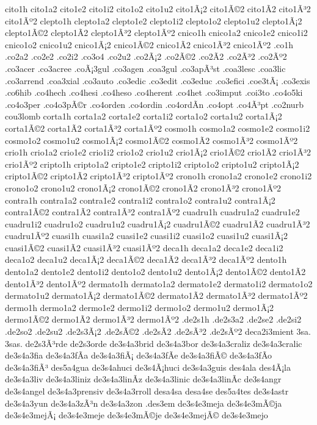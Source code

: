 {cito1h
cito1a2 cito1e2 cito1i2 cito1o2 cito1u2
cito1Ã¡2 cito1Ã©2 cito1Ã­2 cito1Ã³2 cito1Ãº2
clepto1h
clepto1a2 clepto1e2 clepto1i2 clepto1o2 clepto1u2
clepto1Ã¡2 clepto1Ã©2 clepto1Ã­2 clepto1Ã³2 clepto1Ãº2
cnico1h
cnico1a2 cnico1e2 cnico1i2 cnico1o2 cnico1u2
cnico1Ã¡2 cnico1Ã©2 cnico1Ã­2 cnico1Ã³2 cnico1Ãº2
.co1h
.co2a2
.co2e2
.co2i2
.co3o4
.co2u2
.co2Ã¡2
.co2Ã©2
.co2Ã­2
.co2Ã³2
.co2Ãº2
.co3acer
.co3acree
.coÃ¡3gul
.co3agen
.coa3gul
.co3apÃ³st
.coa3lesc
.coa3lic
.co3arrend
.coa3xial
.co3auto
.co3edic
.co3edit
.co3educ
.co3efici
.coe3tÃ¡
.co3exis
.co6hib
.co4hech
.co4hesi
.co4heso
.co4herent
.co4het
.co3imput
.coi3to
.co4o5ki
.co4o3per
.co4o3pÃ©r
.co4orden
.co4ordin
.co4ordÃ­n
.co4opt
.co4Ã³pt
.co2nurb
cou3lomb
corta1h
corta1a2 corta1e2 corta1i2 corta1o2 corta1u2
corta1Ã¡2 corta1Ã©2 corta1Ã­2 corta1Ã³2 corta1Ãº2
cosmo1h
cosmo1a2 cosmo1e2 cosmo1i2 cosmo1o2 cosmo1u2
cosmo1Ã¡2 cosmo1Ã©2 cosmo1Ã­2 cosmo1Ã³2 cosmo1Ãº2
crio1h
crio1a2 crio1e2 crio1i2 crio1o2 crio1u2
crio1Ã¡2 crio1Ã©2 crio1Ã­2 crio1Ã³2 crio1Ãº2
cripto1h
cripto1a2 cripto1e2 cripto1i2 cripto1o2 cripto1u2
cripto1Ã¡2 cripto1Ã©2 cripto1Ã­2 cripto1Ã³2 cripto1Ãº2
crono1h
crono1a2 crono1e2 crono1i2 crono1o2 crono1u2
crono1Ã¡2 crono1Ã©2 crono1Ã­2 crono1Ã³2 crono1Ãº2
contra1h
contra1a2 contra1e2 contra1i2 contra1o2 contra1u2
contra1Ã¡2 contra1Ã©2 contra1Ã­2 contra1Ã³2 contra1Ãº2
cuadru1h
cuadru1a2 cuadru1e2 cuadru1i2 cuadru1o2 cuadru1u2
cuadru1Ã¡2 cuadru1Ã©2 cuadru1Ã­2 cuadru1Ã³2 cuadru1Ãº2
cuasi1h
cuasi1a2 cuasi1e2 cuasi1i2 cuasi1o2 cuasi1u2
cuasi1Ã¡2 cuasi1Ã©2 cuasi1Ã­2 cuasi1Ã³2 cuasi1Ãº2
deca1h
deca1a2 deca1e2 deca1i2 deca1o2 deca1u2
deca1Ã¡2 deca1Ã©2 deca1Ã­2 deca1Ã³2 deca1Ãº2
dento1h
dento1a2 dento1e2 dento1i2 dento1o2 dento1u2
dento1Ã¡2 dento1Ã©2 dento1Ã­2 dento1Ã³2 dento1Ãº2
dermato1h
dermato1a2 dermato1e2 dermato1i2 dermato1o2 dermato1u2
dermato1Ã¡2 dermato1Ã©2 dermato1Ã­2 dermato1Ã³2 dermato1Ãº2
dermo1h
dermo1a2 dermo1e2 dermo1i2 dermo1o2 dermo1u2
dermo1Ã¡2 dermo1Ã©2 dermo1Ã­2 dermo1Ã³2 dermo1Ãº2
.de2s1h
.de2s3a2
.de2se2
.de2si2
.de2so2
.de2su2
.de2s3Ã¡2
.de2sÃ©2
.de2sÃ­2
.de2sÃ³2
.de2sÃº2
deca2i3mient
3sa.
3sas.
de2s3Ã³rde
de2s3orde
de3s4a3brid
de3s4a3bor
de3s4a3craliz
de3s4a3cralic
de3s4a3fia
de3s4a3fÃ­a
de3s4a3fiÃ¡
de3s4a3fÃ­e
de3s4a3fiÃ©
de3s4a3fÃ­o
de3s4a3fiÃ³
des5a4gua
de3s4ahuci
de3s4Ã¡huci
de3s4a3guis
des4ala
des4Ã¡la
de3s4a3liv
de3s4a3liniz
de3s4a3linÃ­z
de3s4a3linic
de3s4a3linÃ­c
de3s4angr
de3s4angel
de3s4a3prensiv
de3s4a3rroll
desa4sa
desa4se
des5a4tes
de3s4astr
de3s4a3yun
de3s4a3zÃ³n
de3s4a3zon
.des3em
de3s4e3meja
de3s4e3mÃ©ja
de3s4e3mejÃ¡
de3s4e3meje
de3s4e3mÃ©je
de3s4e3mejÃ©
de3s4e3mejo
}

